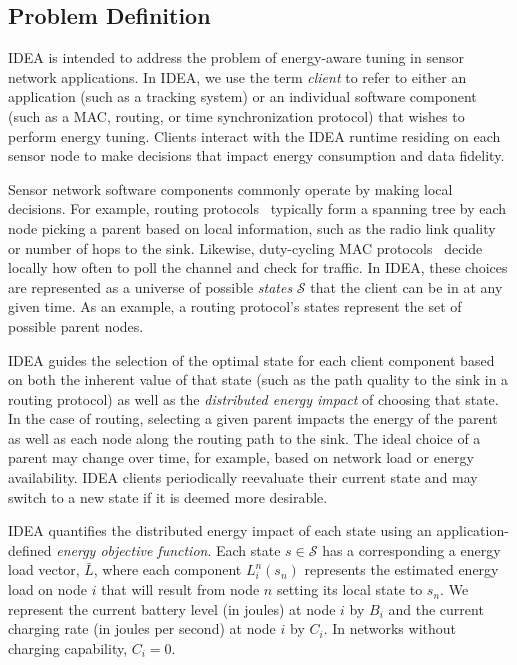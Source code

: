 \documentclass{sig-alternate}
\begin{document}
\subsection{Problem Definition}

IDEA is intended to address the problem of energy-aware tuning in sensor
network applications. In IDEA, we use the term \textit{client} to refer to
either an application (such as a tracking system) or an individual software
component (such as a MAC, routing, or time synchronization protocol) that
wishes to perform energy tuning. Clients interact with the IDEA runtime
residing on each sensor node to make decisions that impact energy consumption
and data fidelity.

Sensor network software components commonly operate by making local
decisions. For example, routing protocols~\cite{ctp,awoo-multihop} typically
form a spanning tree by each node picking a parent based on local
information, such as the radio link quality or number of hops to the sink.
Likewise, duty-cycling MAC protocols~\cite{bmac-sensys04} decide locally how
often to poll the channel and check for traffic. In IDEA, these choices are
represented as a universe of possible \textit{states} $\mathcal{S}$ that the
client can be in at any given time. As an example, a routing protocol's
states represent the set of possible parent nodes.

IDEA guides the selection of the optimal state for each client component
based on both the inherent value of that state (such as the path quality to
the sink in a routing protocol) as well as the \textit{distributed energy
impact} of choosing that state. In the case of routing, selecting a given
parent impacts the energy of the parent as well as each node along the
routing path to the sink. The ideal choice of a parent may change over time,
for example, based on network load or energy availability. IDEA clients
periodically reevaluate their current state and may switch to a new state if
it is deemed more desirable.

IDEA quantifies the distributed energy impact of each state using an
application-defined \textit{energy objective function}. Each state $s \in
\mathcal{S}$ has a corresponding a energy load vector, $\bar{L}$, where each
component $L_i^n(s_n)$ represents the estimated energy load on node $i$ that
will result from node $n$ setting its local state to $s_n$. We represent the
current battery level (in joules) at node $i$ by $B_i$ and the current
charging rate (in joules per second) at node $i$ by $C_i$. In networks
without charging capability, $C_i = 0$.
\end{document}
